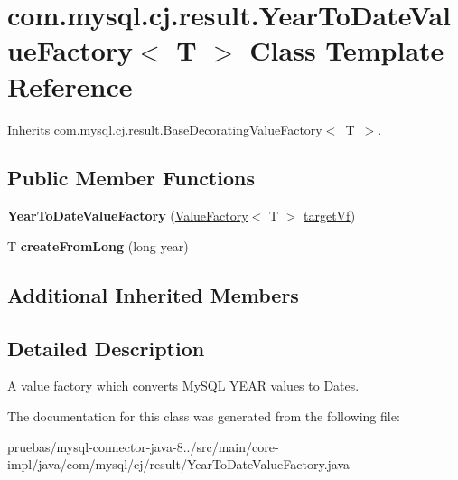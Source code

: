 \hypertarget{classcom_1_1mysql_1_1cj_1_1result_1_1_year_to_date_value_factory}{}\section{com.\+mysql.\+cj.\+result.\+Year\+To\+Date\+Value\+Factory$<$ T $>$ Class Template Reference}
\label{classcom_1_1mysql_1_1cj_1_1result_1_1_year_to_date_value_factory}


Inherits \mbox{\hyperlink{classcom_1_1mysql_1_1cj_1_1result_1_1_base_decorating_value_factory}{com.\+mysql.\+cj.\+result.\+Base\+Decorating\+Value\+Factory$<$ T $>$}}.

\subsection*{Public Member Functions}
\begin{DoxyCompactItemize}
\item 
\mbox{\label{classcom_1_1mysql_1_1cj_1_1result_1_1_year_to_date_value_factory_ac56c5348fac345d1878baacb0f8ab999}} 
{\bfseries Year\+To\+Date\+Value\+Factory} (\mbox{\hyperlink{interfacecom_1_1mysql_1_1cj_1_1result_1_1_value_factory}{Value\+Factory}}$<$ T $>$ \mbox{\hyperlink{classcom_1_1mysql_1_1cj_1_1result_1_1_base_decorating_value_factory_a64c2c62bd9906ec3af7fc62e58bf34b3}{target\+Vf}})
\item 
\mbox{\label{classcom_1_1mysql_1_1cj_1_1result_1_1_year_to_date_value_factory_a3da51ee200c8868b0a8e2c84cecdb8c1}} 
T {\bfseries create\+From\+Long} (long year)
\end{DoxyCompactItemize}
\subsection*{Additional Inherited Members}


\subsection{Detailed Description}
A value factory which converts My\+S\+QL Y\+E\+AR values to Dates. 

The documentation for this class was generated from the following file\+:\begin{DoxyCompactItemize}
\item 
pruebas/mysql-\/connector-\/java-\/8../src/main/core-\/impl/java/com/mysql/cj/result/Year\+To\+Date\+Value\+Factory.\+java\end{DoxyCompactItemize}
